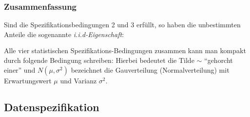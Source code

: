 \subsubsection*{Zusammenfassung}
Sind die Spezifikationsbedingungen 2 und 3 erf\"ullt, so haben die
unbestimmten Anteile die sogenannte \textit{i.i.d-Eigenschaft}:


\noindent
Alle vier statistischen Spezifikations-Bedingungen zusammen 
kann man kompakt durch folgende
Bedingung schreiben:
Hierbei bedeutet die Tilde $\sim$ ``gehorcht einer'' und
$N(\mu,\sigma^2)$ bezeichnet die Gau\3verteilung (Normalverteilung)
mit Erwartungswert $\mu$ und Varianz $\sigma^2$.



\subsection{\label{sec:spezData}Datenspezifikation}


